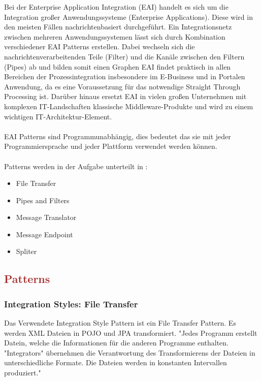 \documentclass[12pt]{article}
\begin{document}
Bei der Enterprise Application Integration (EAI) handelt es sich um die Integration großer
Anwendungssysteme (Enterprise Applications). Diese wird in den meisten Fällen nachrichtenbasiert durchgeführt. Ein Integrationsnetz zwischen mehreren Anwendungssystemen lässt
sich durch Kombination verschiedener EAI Patterns erstellen. Dabei wechseln sich die nachrichtenverarbeitenden Teile (Filter) und die Kanäle zwischen den Filtern (Pipes) ab und
bilden somit einen Graphen \cite{EAIUniStuttgart}
EAI findet praktisch in allen Bereichen der Prozessintegration insbesondere im E-Business und in Portalen Anwendung, da es eine Voraussetzung für das notwendige Straight Through Processing ist. Darüber hinaus ersetzt EAI in vielen großen Unternehmen mit komplexen IT-Landschaften klassische Middleware-Produkte und wird zu einem wichtigen IT-Architektur-Element.
\\\\
EAI Patterns sind Programmunabhängig, dies bedeutet das sie mit jeder Programmiersprache und jeder Plattform verwendet werden können.
\\\\
Patterns werden in der Aufgabe unterteilt in : 

\begin{itemize}
\item File Transfer
\item Pipes and Filters
\item Message Translator
\item Message Endpoint
\item Spliter
\end{itemize}

\textcolor{brown}{\subsection{Patterns}}
\subsubsection{Integration Styles: File Transfer}

Das Verwendete Integration Style Pattern ist ein File Transfer Pattern. Es werden XML Dateien in POJO und JPA transformiert.
"Jedes Programm erstellt Datein, welche die Informationen für die anderen Programme
enthalten. "Integrators" übernehmen die Verantwortung des Transformierens der Dateien in
unterschiedliche Formate. Die Dateien werden in konstanten Intervallen produziert." \\\\
\end{document}
